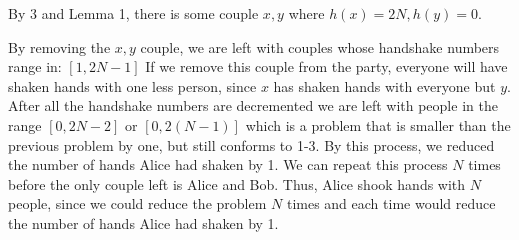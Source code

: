 \documentclass[11pt]{article}
\begin{document}
\begin{problems}
\begin{longFormProof}
 \vspace*{-1em}
 \hrulefill
 \smallskip

 \step By 3 and Lemma 1, there is some couple $x,y$ where $h(x)=2N, h(y)=0$.

 \step By removing the $x,y$ couple, we are left with couples whose handshake numbers range in: $[1, 2N-1]$ 
 \step If we remove this couple from the party, everyone will have shaken hands with one less person, since $x$ has shaken hands with everyone but $y$.
 \step After all the handshake numbers are decremented we are left with people in the range $[0, 2N-2]$ or $[0, 2(N-1)]$ which is a problem that is smaller than the previous problem by one, but still conforms to 1-3.
 \step By this process, we reduced the number of hands Alice had shaken by 1.
 \step We can repeat this process $N$ times before the only couple left is Alice and Bob.
 \step Thus, Alice shook hands with $N$ people, since we could reduce the problem $N$ times and each time would reduce the number of hands Alice had shaken by 1.
 
\end{longFormProof}
 
\end{problems}
\end{document}
